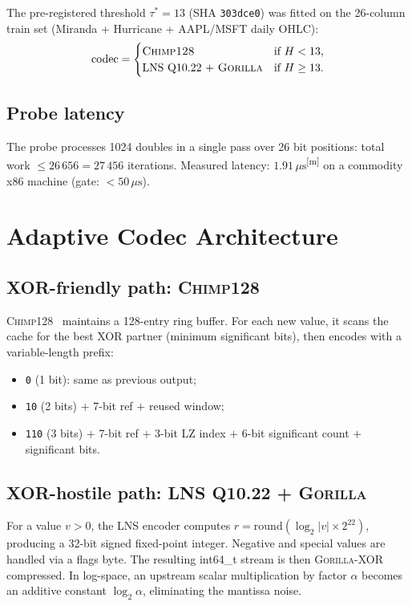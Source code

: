 \documentclass[sigconf]{acmart}
\newcommand{\gorilla}{\textsc{Gorilla}\xspace}
\newcommand{\chimp}{\textsc{Chimp128}\xspace}
\newcommand{\measured}{\textsuperscript{[m]}\xspace}
\begin{document}
The pre-registered threshold $\tau^* = 13$ (SHA \texttt{303dce0})
was fitted on the 26-column train set (Miranda + Hurricane + AAPL/MSFT
daily OHLC):
\[
  \text{codec} = \begin{cases}
    \chimp & \text{if } H < 13, \\
    \text{LNS Q10.22 + }\gorilla & \text{if } H \geq 13.
  \end{cases}
\]

\subsection{Probe latency}

The probe processes 1024 doubles in a single pass over 26 bit positions:
total work $\leq 26\,656 = 27\,456$ iterations.  Measured latency: $1.91\,\mu\text{s}$\measured on a commodity x86 machine (gate: $< 50\,\mu\text{s}$).

\section{Adaptive Codec Architecture}
\label{sec:codec}

\subsection{XOR-friendly path: \chimp}

\chimp~\cite{Chimp2022} maintains a 128-entry ring buffer.  For each new
value, it scans the cache for the best XOR partner (minimum significant
bits), then encodes with a variable-length prefix:
\begin{itemize}
\item \texttt{0} (1 bit): same as previous output;
\item \texttt{10} (2 bits) $+$ 7-bit ref $+$ reused window;
\item \texttt{110} (3 bits) $+$ 7-bit ref $+$ 3-bit LZ index $+$ 6-bit
      significant count $+$ significant bits.
\end{itemize}

\subsection{XOR-hostile path: LNS Q10.22 + \gorilla}

For a value $v > 0$, the LNS encoder computes
$r = \mathrm{round}(\log_2|v| \times 2^{22})$, producing a 32-bit signed
fixed-point integer.  Negative and special values are handled via a flags
byte.  The resulting int64\_t stream is then \gorilla-XOR compressed.
In log-space, an upstream scalar multiplication by factor $\alpha$ becomes
an additive constant $\log_2\alpha$, eliminating the mantissa noise.
\end{document}
